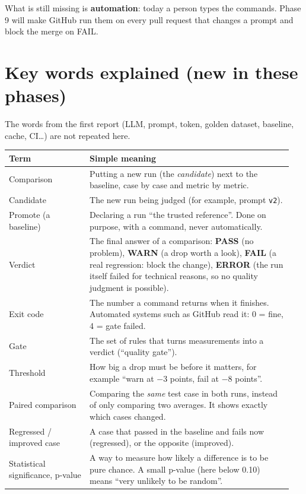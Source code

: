 \documentclass[11pt,a4paper]{article}
\newcommand{\code}[1]{\nolinkurl{#1}}
\newcommand{\minus}{$-$}
\begin{document}
What is still missing is \textbf{automation}: today a person types the commands. Phase 9 will
make GitHub run them on every pull request that changes a prompt and block the merge on FAIL.

\section{Key words explained (new in these phases)}

The words from the first report (LLM, prompt, token, golden dataset, baseline, cache, CI\ldots)
are not repeated here.

\begin{longtable}{@{}p{0.27\linewidth}p{0.68\linewidth}@{}}
\toprule
\textbf{Term} & \textbf{Simple meaning} \\
\midrule
\endhead
Comparison & Putting a new run (the \emph{candidate}) next to the baseline, case by case and metric by metric. \\
Candidate & The new run being judged (for example, prompt \code{v2}). \\
Promote (a baseline) & Declaring a run ``the trusted reference''. Done on purpose, with a command, never automatically. \\
Verdict & The final answer of a comparison: \textbf{PASS} (no problem), \textbf{WARN} (a drop worth a look), \textbf{FAIL} (a real regression: block the change), \textbf{ERROR} (the run itself failed for technical reasons, so no quality judgment is possible). \\
Exit code & The number a command returns when it finishes. Automated systems such as GitHub read it: 0 = fine, 4 = gate failed. \\
Gate & The set of rules that turns measurements into a verdict (``quality gate''). \\
Threshold & How big a drop must be before it matters, for example ``warn at \minus3 points, fail at \minus8 points''. \\
Paired comparison & Comparing the \emph{same} test case in both runs, instead of only comparing two averages. It shows exactly which cases changed. \\
Regressed / improved case & A case that passed in the baseline and fails now (regressed), or the opposite (improved). \\
Statistical significance, p-value & A way to measure how likely a difference is to be pure chance. A small p-value (here below 0.10) means ``very unlikely to be random''. \\

\end{longtable}
\end{document}

